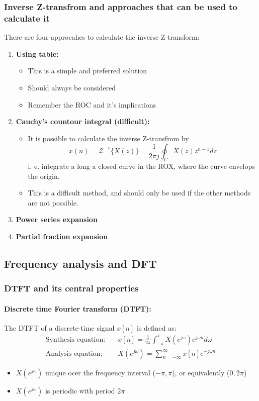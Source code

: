 \documentclass{article}
\begin{document}
\clearpage
\subsubsection{Inverse Z-transfrom and approaches that can be used to calculate it}
There are four approcahes to calculate the inverse Z-transform:
\begin{enumerate}
    \item \textbf{Using table:} 
    \begin{itemize}
        \item This is a simple and preferred solution
        \item Should always be considered
        \item Remember the ROC and it's implications
    \end{itemize}
    \item \textbf{Cauchy's countour integral (difficult):}
    \begin{itemize}
        \item It is possible to calculate the inverse Z-transfrom by
        \begin{equation}
            x(n) = \mathcal{Z}^{-1}\{X(z)\} = \frac{1}{2\pi j} \oint_C X(z)z^{n-1}dz
        \end{equation}
        i. e. integrate a long a closed curve in the ROX, where the curve envelops the origin.
        \item This is a difficult method, and should only be used if the other methods are not possible.
    \end{itemize}
    \item \textbf{Power series expansion}
    \item \textbf{Partial fraction expansion}
\end{enumerate}

\subsection{Frequency analysis and DFT}

\subsubsection{DTFT and its central properties}

\paragraph{Discrete time Fourier transform (DTFT):} The DTFT of a discrete-time signal $x[n]$ is defined as:
\begin{align}
    \text{Synthesis equation:} \quad & x[n] = \frac{1}{2\pi} \int_{-\pi}^{\pi} X(e^{j\omega})e^{j\omega n} d\omega \\
    \text{Analysis equation:} \quad & X(e^{j\omega}) = \sum_{n=-\infty}^{\infty} x[n]e^{-j\omega n}
\end{align}
\begin{itemize}
    \item $X(e^{j\omega})$ unique ocer the frequency interval ($-\pi,\pi$), or equivalently ($0,2\pi$)
    \item $X(e^{j\omega})$ is periodic with period $2\pi$
\end{itemize}
\end{document}
